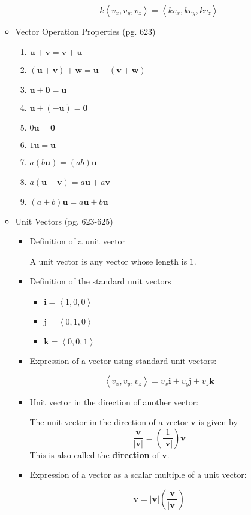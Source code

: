 \documentclass[12pt]{article}
\theoremstyle{plain}
\theoremstyle{definition}
\theoremstyle{remark}
\newcommand{\vect}[1]{\mathbf{#1}}
\newcommand{\veci}{\mathbf{i}}
\newcommand{\vecj}{\mathbf{j}}
\newcommand{\veck}{\mathbf{k}}
\begin{document}
\begin{itemize}
\begin{itemize}
\begin{itemize}
		\[k\left<v_x,v_y,v_z\right> = \left<kv_x,kv_y,kv_z\right> \]
		\end{itemize}
	\item Vector Operation Properties (pg. 623)
		\begin{enumerate}
		\item $\vect{u}+\vect{v} = \vect{v}+\vect{u}$
		\item $(\vect{u}+\vect{v})+\vect{w} = \vect{u}+(\vect{v}+\vect{w})$
		\item $\vect{u}+\vect{0} = \vect{u}$
		\item $\vect{u}+(-\vect{u}) = \vect{0}$
		\item $0\vect{u} = \vect{0}$
\newpage	\item $1\vect{u} = \vect{u}$
		\item $a(b\vect{u}) = (ab)\vect{u}$
		\item $a(\vect{u} + \vect{v}) = a\vect{u} + a\vect{v}$
		\item $(a+b)\vect{u} = a\vect{u} + b\vect{u}$
		\end{enumerate}
	\item Unit Vectors (pg. 623-625)
		\begin{itemize}
		\item Definition of a unit vector
		
		A unit vector is any vector whose length is $1$.
		
		\item Definition of the standard unit vectors
			\begin{itemize}
			\item $\veci = \left<1,0,0\right>$
			\item $\vecj = \left<0,1,0\right>$
			\item $\veck = \left<0,0,1\right>$
			\end{itemize}

		\item Expression of a vector using standard unit vectors:
			
		\[\left<v_x,v_y,v_z\right> = v_x\veci + v_y\vecj + v_z\veck\]
		\item Unit vector in the direction of another vector:
			
		The unit vector in the direction of a vector $\vect{v}$ is given by \[\frac{\vect{v}}{|\vect{v}|} = \left(\frac{1}{|\vect{v}|}\right)\vect{v} \] This is also called the \textbf{direction} of $\vect{v}$.
		\item Expression of a vector as a scalar multiple of a unit vector:
			
		\[\vect{v} = |\vect{v}|\left(\frac{\vect{v}}{|\vect{v}|}\right)\]

		\end{itemize}
	\end{itemize}
\end{itemize}
\end{document}
